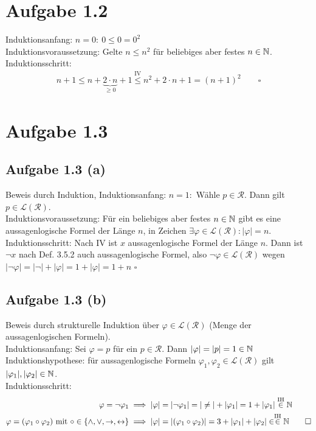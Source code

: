 \documentclass[12pt,a4paper]{article}
\begin{document}
\section*{Aufgabe 1.2}
Induktionsanfang: $n=0:~0\leq0=0^2$\\
Induktionsvoraussetzung: Gelte $n\leq n^2$ für beliebiges aber festes $n\in\mathbb{N}$.\\
Induktionsschritt: 
\begin{align*}
n+1\leq
n+\underbrace{2\cdot n}_{\geq0}+1
\stackrel{\text{IV}}{\leq} n^2+2\cdot n+1=(n+1)^2\qquad\square
\end{align*}

\section*{Aufgabe 1.3}
\subsection*{Aufgabe 1.3 (a)}
Beweis durch Induktion, Induktionsanfang: $n=1:$ Wähle $p\in\mathcal{R}$. Dann gilt $p\in\mathcal{L}(\mathcal{R})$.\\
Induktionsvoraussetzung: Für ein beliebiges aber festes $n\in\mathbb{N}$ gibt es eine aussagenlogische Formel der Länge $n$, in Zeichen $\exists\varphi\in\mathcal{L}(\mathcal{R}):|\varphi|=n$.\\
Induktionsschritt: Nach IV ist $x$ aussagenlogische Formel der Länge $n$. Dann ist $\neg x$ nach Def. 3.5.2 auch aussagenlogische Formel, also $\neg\varphi\in\mathcal{L}(\mathcal{R})$ wegen
$|\neg\varphi|=|\neg|+|\varphi|=1+|\varphi|=1+n$ $\square$

\subsection*{Aufgabe 1.3 (b)}
Beweis durch strukturelle Induktion über $\varphi\in\mathcal{L}(\mathcal{R})$ (Menge der aussagenlogischen Formeln).\\
Induktionsanfang: Sei $\varphi=p$ für ein $p\in\mathcal{R}$. Dann $|\varphi|=|p|=1\in\mathbb{N}$\\
Induktionshypothese: für aussagenlogische Formeln $\varphi_1,\varphi_2\in\mathcal{L}(\mathcal{R})$ gilt $|\varphi_1|,|\varphi_2|\in\mathbb{N}$.\\
Induktionsschritt: 
\begin{align*}
\varphi=\neg\varphi_1&\implies|\varphi|=|\neg\varphi_1|=|\neq|+|\varphi_1|=1+|\varphi_1|\stackrel{\text{IH}}{\in}\mathbb{N}\\
\varphi=(\varphi_1\circ\varphi_2)\text{ mit }\circ\in\lbrace\wedge,\vee,\to,\leftrightarrow\rbrace&\implies|\varphi|=|(\varphi_1\circ\varphi_2)|=3+|\varphi_1|+|\varphi_2|\in\stackrel{\text{IH}}{\in}\mathbb{N}\qquad\square
\end{align*}
\end{document}

